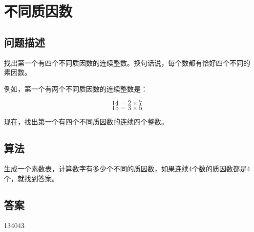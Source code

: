 \section{不同质因数}
\subsection{问题描述}
\begin{tcolorbox}
找出第一个有四个不同质因数的连续整数。换句话说，每个数都有恰好四个不同的素因数。 

例如，第一个有两个不同质因数的连续整数是：

\[
14 = 2 \times 7
\]
\[
15 = 3 \times 5
\]

现在，找出第一个有四个不同质因数的连续四个整数。

\end{tcolorbox}

\subsection{算法}
生成一个素数表，计算数字有多少个不同的质因数，如果连续4个数的质因数都是4个，就找到答案。


\subsection{答案}
134043
